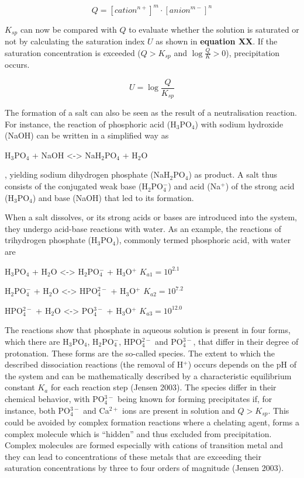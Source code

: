 \documentclass[
]{article}
\begin{document}
\[
Q = [cation^{n+}]^{m} \cdot [anion^{m-}]^{n}
\]

\(K_{sp}\) can now be compared with \(Q\) to evaluate whether the solution is saturated or not by calculating the saturation index \(U\) as shown in \textbf{equation XX}. If the saturation concentration is exceeded (\(Q > K_{sp}\) and \(\log{\frac{Q}{K}} > 0\)), precipitation occurs.

\[
U = \log{\frac{Q}{K_{sp}}}
\]

The formation of a salt can also be seen as the result of a neutralisation reaction. For instance, the reaction of phosphoric acid (H\(_{3}\)PO\(_{4}\)) with sodium hydroxide (NaOH) can be written in a simplified way as

H\(_{3}\)PO\(_{4}\) + NaOH \textless-\textgreater{} NaH\(_{2}\)PO\(_{4}\) + H\(_{2}\)O

, yielding sodium dihydrogen phosphate (NaH\(_{2}\)PO\(_{4}\)) as product. A salt thus consists of the conjugated weak base (H\(_{2}\)PO\(_{4}^{-}\)) and acid (Na\(^{+}\)) of the strong acid (H\(_{3}\)PO\(_{4}\)) and base (NaOH) that led to its formation.

When a salt dissolves, or its strong acids or bases are introduced into the system, they undergo acid-base reactions with water. As an example, the reactions of trihydrogen phosphate (H\(_{3}\)PO\(_{4}\)), commonly termed phosphoric acid, with water are

H\(_{3}\)PO\(_{4}\) + H\(_{2}\)O \textless-\textgreater{} H\(_{2}\)PO\(_{4}^{-}\) + H\(_{3}\)O\(^{+}\) \(K_{a1} = 10^{2.1}\)

H\(_{2}\)PO\(_{4}^{-}\) + H\(_{2}\)O \textless-\textgreater{} HPO\(_{4}^{2-}\) + H\(_{3}\)O\(^{+}\) \(K_{a2} = 10^{7.2}\)

HPO\(_{4}^{2-}\) + H\(_{2}\)O \textless-\textgreater{} PO\(_{4}^{3-}\) + H\(_{3}\)O\(^{+}\) \(K_{a3} = 10^{12.0}\)

The reactions show that phosphate in aqueous solution is present in four forms, which there are H\(_{3}\)PO\(_{4}\), H\(_{2}\)PO\(_{4}^{-}\), HPO\(_{4}^{2-}\) and PO\(_{4}^{3-}\), that differ in their degree of protonation. These forms are the so-called species. The extent to which the described dissociation reactions (the removal of H\(^{+}\)) occurs depends on the pH of the system and can be mathematically described by a characteristic equilibrium constant \(K_{a}\) for each reaction step (Jensen 2003).
The species differ in their chemical behavior, with PO\(_{4}^{3-}\) being known for forming precipitates if, for instance, both PO\(_{4}^{3-}\) and Ca\(^{2+}\) ions are present in solution and \(Q > K_{sp}\). This could be avoided by complex formation reactions where a chelating agent, forms a complex molecule which is ``hidden'' and thus excluded from precipitation. Complex molecules are formed especially with cations of transition metal and they can lead to concentrations of these metals that are exceeding their saturation concentrations by three to four orders of magnitude (Jensen 2003).
\end{document}
